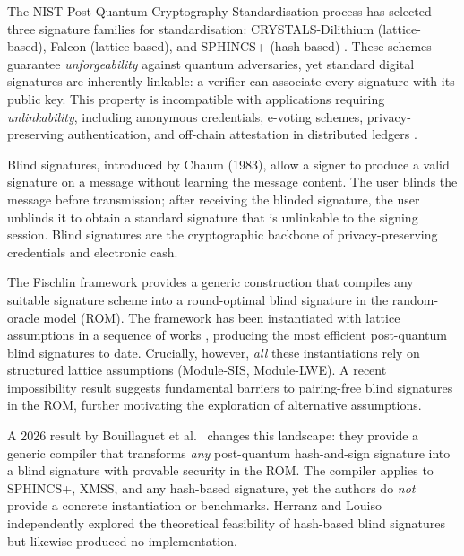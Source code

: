 \documentclass[11pt,a4paper]{article}
\newcommand{\ROM}{\textsf{ROM}}
\begin{document}
The NIST Post-Quantum Cryptography Standardisation process has selected three signature
families for standardisation: CRYSTALS-Dilithium (lattice-based), Falcon (lattice-based), and
SPHINCS+ (hash-based) \cite{Bernstein2019SPHINCS,NIST2022IR8413}.  These schemes guarantee
\emph{unforgeability} against quantum adversaries, yet standard digital signatures are inherently
linkable: a verifier can associate every signature with its public key.  This property is
incompatible with applications requiring \emph{unlinkability}, including anonymous credentials,
e-voting schemes, privacy-preserving authentication, and off-chain attestation in distributed
ledgers \cite{Buser2022ExoticSigs,Chathurangi2025Advances}.

Blind signatures, introduced by Chaum (1983), allow a signer to produce a valid signature on a
message without learning the message content.  The user blinds the message before transmission;
after receiving the blinded signature, the user unblinds it to obtain a standard signature that is
unlinkable to the signing session.  Blind signatures are the cryptographic backbone of
privacy-preserving credentials and electronic cash.

The Fischlin framework \cite{Fuchsbauer2015Practical} provides a generic construction that
compiles any suitable signature scheme into a round-optimal blind signature in the random-oracle
model (\ROM).  The framework has been instantiated with lattice assumptions in a sequence of
works \cite{delPino2022Framework,Beullens2023LatticeBlind,Agrawal2022Practical,
Katsumata2021}, producing the most efficient post-quantum blind signatures to date.
Crucially, however, \emph{all} these instantiations rely on structured lattice assumptions
(Module-SIS, Module-LWE).  A recent impossibility result \cite{Dietz2026Impossibility} suggests
fundamental barriers to pairing-free blind signatures in the \ROM, further motivating the
exploration of alternative assumptions.

A 2026 result by Bouillaguet et al.~\cite{Bouillaguet2026BlindingPH} changes this landscape:
they provide a generic compiler that transforms \emph{any} post-quantum hash-and-sign signature
into a blind signature with provable security in the \ROM.  The compiler applies to SPHINCS+,
XMSS, and any hash-based signature, yet the authors do \emph{not} provide a concrete
instantiation or benchmarks.  Herranz and Louiso~\cite{Herranz2025HashBased} independently
explored the theoretical feasibility of hash-based blind signatures but likewise produced no
implementation.
\end{document}
